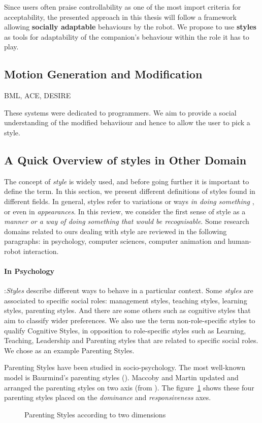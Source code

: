 \documentclass[smallextended]{svjour3}
\begin{document}
Since users often praise controllability as one of the most import criteria for acceptability, the presented approach in this thesis will follow a framework allowing \textbf{socially adaptable} behaviours by the robot.
We propose to use \textbf{styles} as tools for adaptability of the companion's behaviour within the role it has to play.

\subsection{Motion Generation and Modification}
BML, 
ACE, DESIRE

These systems were dedicated to programmers. 
We aim to provide a social understanding of the modified behaviiour and hence to allow the user to pick a style.

\subsection{A Quick Overview of styles in Other Domain}
\label{sec:soa_styles}
The concept of \textit{style} is widely used, and before going further it is important to define the term. 
In this section, we present different definitions of  styles found in  different fields.
In general,  styles refer to variations or ways  \textit{in doing something }, or even in \textit{appearances}.
In this review, we consider the first sense of style as a\textit{ manner or a way of doing something that would be recognisable}.
Some research domains related to ours dealing with style are reviewed in the following paragraphs: in psychology, computer sciences, computer animation and  human-robot interaction. 

\paragraph{In Psychology}:\textit{Styles} describe different ways to behave in a particular context. 
Some \textit{styles} are associated to specific social roles: management styles, teaching styles, learning styles, parenting styles. 
And there are some others such as cognitive styles that aim to classify wider preferences.
We also use the term non-role-specific styles to qualify Cognitive Styles, in opposition to role-specific styles such as  Learning, Teaching, Leadership and Parenting styles that are related to specific social roles. 
We chose as an example Parenting Styles.

Parenting Styles have been studied in socio-psychology. 
The most well-known model is Baurmind's parenting styles (\cite{baumrind1991influence}).
Maccoby and Martin updated and arranged  the parenting styles on two axis (from \cite{Darling1993}). 
The figure~\ref{fig:fpareting_style} shows these four parenting styles placed on the \textit{ dominance} and \textit{responsiveness} axes.
\begin{figure}[h]
	\centering
	\caption{Parenting Styles according to two dimensions}
	\label{fig:fpareting_style}
\end{figure}
\end{document}
